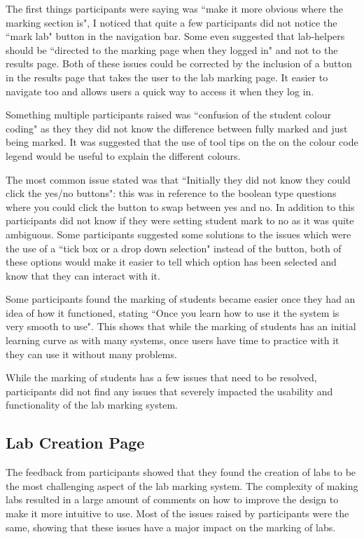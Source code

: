 \documentclass[11pt]{report}
\begin{document}
The first things participants were saying was ``make it more obvious where the marking section is", I noticed that quite a few participants did not notice the ``mark lab" button in the navigation bar. Some even suggested that lab-helpers should be ``directed to the marking page when they logged in" and not to the results page. Both of these issues could be corrected by the inclusion of a button in the results page that takes the user to the lab marking page. It easier to navigate too and allows users a quick way to access it when they log in. 

Something multiple participants raised was ``confusion of the student colour coding" as they they did not know the difference between fully marked and just being marked. It was suggested that the use of tool tips on the on the colour code legend would be useful to explain the different colours. 

The most common issue stated was that ``Initially they did not know they could click the yes/no buttons": this was in reference to the boolean type questions where you could click the button to swap between yes and no. In addition to this participants did not know if they were setting student mark to no as it was quite ambiguous. Some participants suggested some solutions to the issues which were the use of a ``tick box or a drop down selection" instead of the button, both of these options would make it easier to tell which option has been selected and know that they can interact with it.

Some participants found the marking of students became easier once they had an idea of how it functioned, stating ``Once you learn how to use it the system is very smooth to use". This shows that while the marking of students has an initial learning curve as with many systems, once users have time to practice with it they can use it without many problems.

While the marking of students has a few issues that need to be resolved, participants did not find any issues that severely impacted the usability and functionality of the lab marking system.



\subsection*{Lab Creation Page}

The feedback from participants showed that they found the creation of labs to be the most challenging aspect of the lab marking system. The complexity of making labs resulted in a large amount of comments on how to improve the design to make it more intuitive to use. Most of the issues raised by participants were the same, showing that these issues have a major impact on the marking of labs. 
\end{document}
